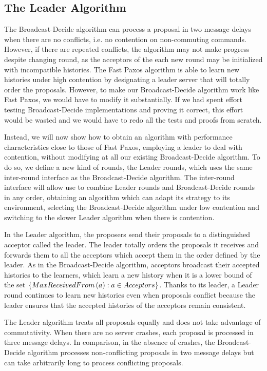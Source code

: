 \subsection{The Leader Algorithm} 

The Broadcast-Decide algorithm can process a proposal in two message delays when there are no conflicts, i.e. no contention on non-commuting commands. However, if there are repeated conflicts, the algorithm may not make progress despite changing round, as the acceptors of the each new round
may be initialized with incompatible histories. The Fast Paxos algorithm \cite{Lamport06FastPaxos} is able to learn new histories under high contention by
designating a leader server that will totally order the proposals. However, to make our Broadcast-Decide algorithm work like Fast Paxos, we would have to modify it substantially. If we had spent effort testing Broadcast-Decide implementations and proving it correct, this effort would be wasted and we would have to redo all the tests and proofs from scratch.

Instead, we will now show how to obtain an algorithm with performance characteristics close to those of Fast Paxos, employing a leader to deal with contention, without modifying at all our existing Broadcast-Decide algorithm.
To do so, we define a new kind of rounds, the Leader rounds, which uses the same inter-round interface as the Broadcast-Decide algorithm. 
The inter-round interface will allow use to combine Leader rounds and Broadcast-Decide rounds in any order, obtaining an algorithm which can adapt its strategy to its environment, selecting the Broadcast-Decide algorithm under low contention and switching to the slower Leader algorithm when there is contention.

In the Leader algorithm, the proposers send their proposals to a distinguished acceptor called the leader. 
The leader totally orders the proposals it receives and forwards them to all the acceptors which accept them in the order defined by the leader.
As in the Broadcast-Decide algorithm, acceptors broadcast their accepted histories to the learners, which learn a new history when it is a lower bound of 
the set $\left\{MaxReceivedFrom\left( a \right) : a \in Acceptors\right\}$.
Thanks to its leader, a Leader round continues to learn new histories even when proposals conflict because the leader ensures that the accepted histories of the acceptors remain consistent. 

The Leader algorithm treats all proposals equally and does not take advantage of commutativity. When there are no server crashes, each proposal is processed in three message delays. In comparison, in the absence of crashes, the Broadcast-Decide algorithm processes non-conflicting proposals in two message delays but can take arbitrarily long to process conflicting proposals.

